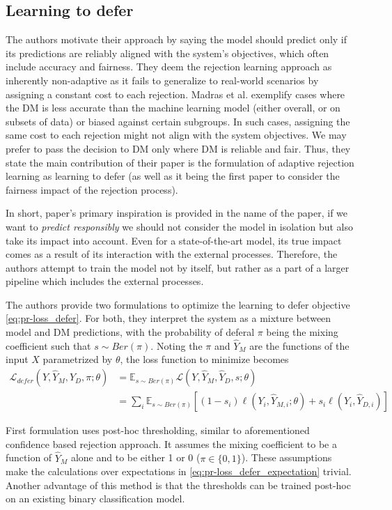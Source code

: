 \documentclass[11pt,a4paper,final]{article}
\begin{document}
\subsection{Learning to defer}
The authors motivate their approach by saying the model should predict only if its predictions are reliably aligned with the system’s objectives, which often include accuracy and fairness. They deem the rejection learning approach as inherently non-adaptive as it fails to generalize to real-world scenarios by assigning a constant cost to each rejection. Madras et al. exemplify cases where the DM is less accurate than the machine learning model (either overall, or on subsets of data) or biased against certain subgroups. In such cases, assigning the same cost to each rejection might not align with the system objectives. We may prefer to pass the decision to DM only where DM is reliable and fair. Thus, they state the main contribution of their paper is the formulation of adaptive rejection learning as learning to defer (as well as it being the first paper to consider the fairness impact of the rejection process).

In short, paper's primary inspiration is provided in the name of the paper, if we want to \textit{predict responsibly} we should not consider the model in isolation but also take its impact into account. Even for a state-of-the-art model, its true impact comes as a result of its interaction with the external processes. Therefore, the authors attempt to train the model not by itself, but rather as a part of a larger pipeline which includes the external processes.

The authors provide two formulations to optimize the learning to defer objective \eqref{eq:pr-loss_defer}. For both, they interpret the system as a mixture between model and DM predictions, with the probability of deferal $\pi$ being the mixing coefficient such that $s \sim Ber(\pi)$. Noting the $\pi$ and $\hat{Y}_M$ are the functions of the input $X$ parametrized by $\theta$, the loss function to minimize becomes
\begin{equation}\label{eq:pr-loss_defer_expectation}
\begin{split}
   \mathcal{L}_{defer}(Y,\hat{Y}_M, \hat{Y}_D, \pi; \theta)  
   & = \mathbb{E}_{s \sim Ber(\pi)} \mathcal{L}(Y,\hat{Y}_M, \hat{Y}_D, s; \theta) \\
   & = \sum\limits_i \mathbb{E}_{s \sim Ber(\pi)} [(1-s_i) \ell(Y_i, \hat{Y}_{M,i}; \theta) + s_i \ell(Y_i, \hat{Y}_{D,i})]
\end{split}
\end{equation}
\par First formulation uses post-hoc thresholding, similar to aforementioned confidence based rejection approach. It assumes the mixing coefficient to be a function of $\hat{Y}_M$ alone and to be either 1 or 0 ($\pi \in \{ 0,1 \}$). These assumptions make the calculations over expectations in \eqref{eq:pr-loss_defer_expectation} trivial. Another advantage of this method is that  the thresholds can be trained post-hoc on an existing binary classification model.
\end{document}
